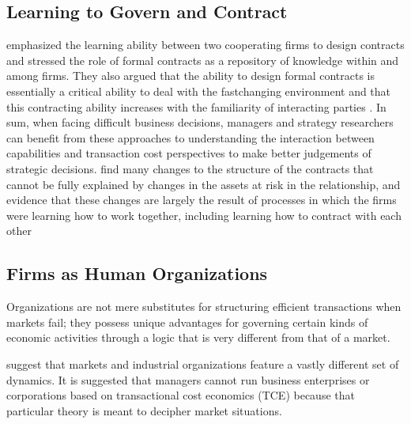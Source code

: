\documentclass[12pt,letterpaper]{article}
\begin{document}
\subsection{Learning to Govern and Contract}
\cite{Mayer2004} emphasized the learning ability between two cooperating firms to
design contracts and stressed the role of formal contracts as a repository of knowledge within and
among firms. They also argued that the ability to design formal contracts is essentially a critical
ability to deal with the fastchanging environment and that this contracting ability increases with the
familiarity of interacting parties \cite{Mayer2004}. In sum, when facing difficult business
decisions, managers and strategy researchers can benefit from these approaches to understanding
the interaction between capabilities and transaction cost perspectives to make better judgements of
strategic decisions. 
\cite{Mayer2004} find many changes to the structure of the contracts that cannot be fully explained by changes in the assets at risk in the relationship, and evidence that these changes are largely the result of processes in which the firms were learning how to work together, including learning how to contract with each other
 

\subsection{Firms as Human Organizations}
\cite{Ghoshal1996} Organizations are not mere substitutes for structuring efficient transactions when markets fail; they possess unique advantages for governing certain kinds of economic activities through a logic that is very different from that of a market.

\cite{Moran1996} suggest that markets and industrial organizations feature a vastly different set of dynamics. It is suggested that managers cannot run business enterprises or corporations based on transactional cost economics (TCE) because that particular theory is meant to decipher market situations.
\end{document}
